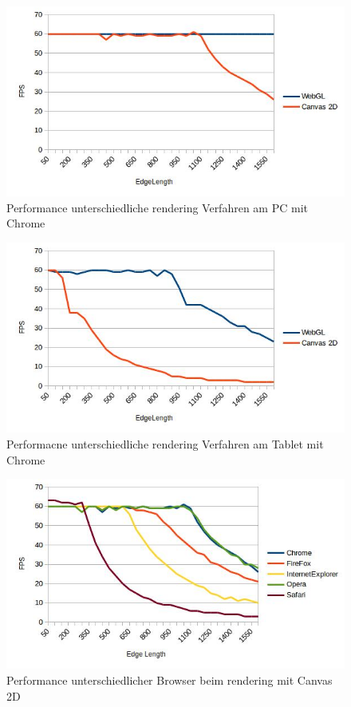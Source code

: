 \begin{figure}[pt]
	\centering
	\includegraphics[width=0.7\linewidth]{img/c4_stat_renderer_pc_chorme.jpg}
	\caption{Performance unterschiedliche rendering Verfahren am PC mit Chrome}
	\label{fig:stat_renderer_pc_chorme}
\end{figure}

\begin{figure}[pt]
	\centering
	\includegraphics[width=0.7\linewidth]{img/c4_stat_renderer_tablet_chorme.jpg}
	\caption{Performacne unterschiedliche rendering Verfahren am Tablet mit Chrome}
	\label{fig:stat_renderer_tablet_chorme}
\end{figure}

\begin{figure}[pt]
	\centering
	\includegraphics[width=0.7\linewidth]{img/c4_stat_browser_js_pc.jpg}
	\caption{Performance unterschiedlicher Browser beim rendering mit Canvas 2D}
	\label{fig:stat_browser_js_pc}
\end{figure}

